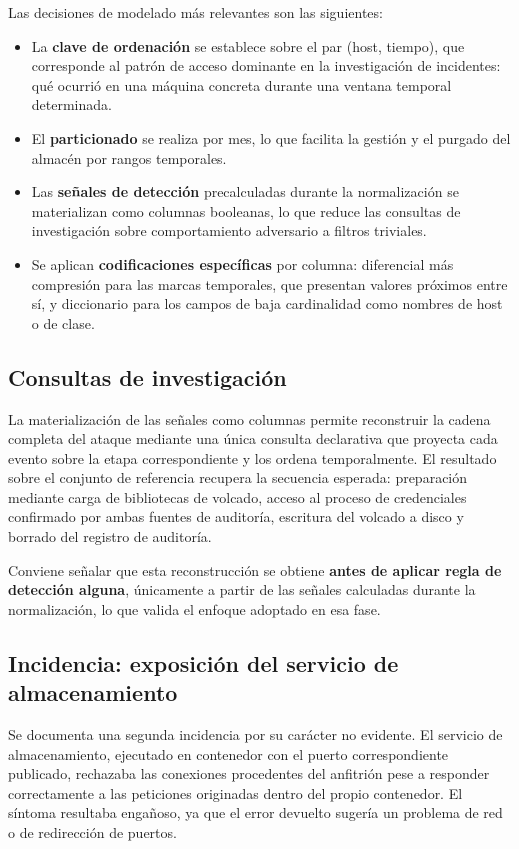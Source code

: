 Las decisiones de modelado más relevantes son las siguientes:

\begin{itemize}
    \item La \textbf{clave de ordenación} se establece sobre el par (host, tiempo), que
    corresponde al patrón de acceso dominante en la investigación de incidentes: qué ocurrió
    en una máquina concreta durante una ventana temporal determinada.
    \item El \textbf{particionado} se realiza por mes, lo que facilita la gestión y el purgado
    del almacén por rangos temporales.
    \item Las \textbf{señales de detección} precalculadas durante la normalización se
    materializan como columnas booleanas, lo que reduce las consultas de investigación sobre
    comportamiento adversario a filtros triviales.
    \item Se aplican \textbf{codificaciones específicas} por columna: diferencial más
    compresión para las marcas temporales, que presentan valores próximos entre sí, y
    diccionario para los campos de baja cardinalidad como nombres de host o de clase.
\end{itemize}

\subsection{Consultas de investigación}

La materialización de las señales como columnas permite reconstruir la cadena completa del
ataque mediante una única consulta declarativa que proyecta cada evento sobre la etapa
correspondiente y los ordena temporalmente. El resultado sobre el conjunto de referencia
recupera la secuencia esperada: preparación mediante carga de bibliotecas de volcado, acceso
al proceso de credenciales confirmado por ambas fuentes de auditoría, escritura del volcado a
disco y borrado del registro de auditoría.

Conviene señalar que esta reconstrucción se obtiene \textbf{antes de aplicar regla de
detección alguna}, únicamente a partir de las señales calculadas durante la normalización, lo
que valida el enfoque adoptado en esa fase.

\subsection{Incidencia: exposición del servicio de almacenamiento}

Se documenta una segunda incidencia por su carácter no evidente. El servicio de
almacenamiento, ejecutado en contenedor con el puerto correspondiente publicado, rechazaba
las conexiones procedentes del anfitrión pese a responder correctamente a las peticiones
originadas dentro del propio contenedor. El síntoma resultaba engañoso, ya que el error
devuelto sugería un problema de red o de redirección de puertos.

